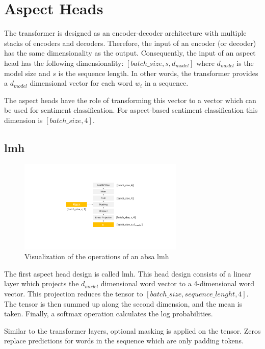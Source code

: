 \section{Aspect Heads}
\label{sec:04_aspectHeads}

The transformer is designed as an encoder-decoder architecture with multiple stacks of encoders and decoders. Therefore, the input of an encoder {(or decoder)} has the same dimensionality as the output. Consequently, the input of an aspect head has the following dimensionality: $[batch\_size, s, d_{model}]$ where $d_{model}$ is the model size and $s$ is the sequence length. In other words, the transformer provides a $d_{model}$ dimensional vector for each word $w_i$ in a sequence.
\medskip

The aspect heads have the role of transforming this vector to a vector which can be used for sentiment classification. For aspect-based sentiment classification this dimension is $[batch\_size, 4]$.

\subsection{\acrfull{lmh}}

\begin{figure}[htp]
    \centering
    \includegraphics[width=0.7\textwidth]{figures/04_method/04_lmh}
    \caption{Visualization of the operations of an \gls{absa} \acrfull{lmh}}
    \label{fig:04_lmh}
\end{figure}

The first aspect head design is called \acrfull{lmh}. This head design consists of a linear layer which projects the $d_{model}$ dimensional word vector to a 4-dimensional word vector. This projection reduces the tensor to $[batch\_size, sequence\_lenght, 4]$. The tensor is then summed up along the second dimension, and the mean is taken. Finally, a softmax operation calculates the log probabilities.

Similar to the transformer layers, optional masking is applied on the tensor. Zeros replace predictions for words in the sequence which are only padding tokens.

